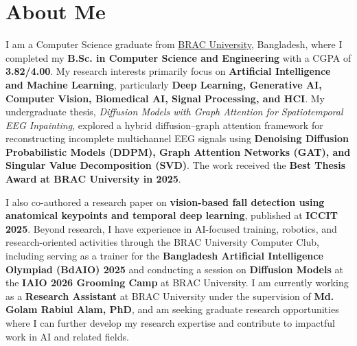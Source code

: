 \section{About Me}

I am a Computer Science graduate from \href{https://www.bracu.ac.bd/}{BRAC University}, Bangladesh, where I completed my \textbf{B.Sc. in Computer Science and Engineering} with a CGPA of \textbf{3.82/4.00}. My research interests primarily focus on \textbf{Artificial Intelligence and Machine Learning}, particularly \textbf{Deep Learning, Generative AI, Computer Vision, Biomedical AI, Signal Processing, and HCI}. My undergraduate thesis, \textit{Diffusion Models with Graph Attention for Spatiotemporal EEG Inpainting}, explored a hybrid diffusion--graph attention framework for reconstructing incomplete multichannel EEG signals using \textbf{Denoising Diffusion Probabilistic Models (DDPM), Graph Attention Networks (GAT), and Singular Value Decomposition (SVD)}. The work received the \textbf{Best Thesis Award at BRAC University in 2025}.

I also co-authored a research paper on \textbf{vision-based fall detection using anatomical keypoints and temporal deep learning}, published at \textbf{ICCIT 2025}. Beyond research, I have experience in AI-focused training, robotics, and research-oriented activities through the BRAC University Computer Club, including serving as a trainer for the \textbf{Bangladesh Artificial Intelligence Olympiad (BdAIO) 2025} and conducting a session on \textbf{Diffusion Models} at the \textbf{IAIO 2026 Grooming Camp} at BRAC University. I am currently working as a \textbf{Research Assistant} at BRAC University under the supervision of \textbf{Md. Golam Rabiul Alam, PhD}, and am seeking graduate research opportunities where I can further develop my research expertise and contribute to impactful work in AI and related fields.

\endinput